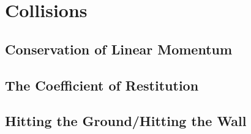 \documentclass[../maths.tex]{subfiles}
\begin{document}
\chapter{Collisions}
\section{Conservation of Linear Momentum}
\section{The Coefficient of Restitution}
\section{Hitting the Ground/Hitting the Wall}
\end{document}

